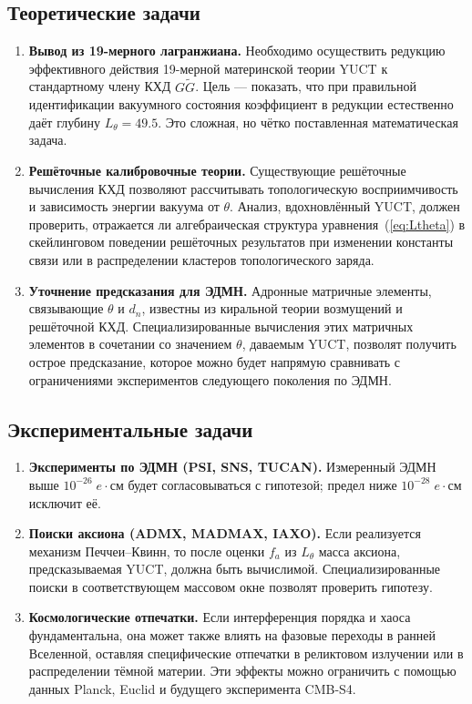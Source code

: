 \documentclass[11pt,a4paper]{article}
\begin{document}
	\subsection{Теоретические задачи}
	\begin{enumerate}
		\item \textbf{Вывод из 19-мерного лагранжиана.}
		Необходимо осуществить редукцию эффективного действия 19-мерной материнской теории YUCT к стандартному члену КХД \(G\widetilde{G}\). Цель — показать, что при правильной идентификации вакуумного состояния коэффициент в редукции естественно даёт глубину \(L_\theta = 49.5\). Это сложная, но чётко поставленная математическая задача.
		\item \textbf{Решёточные калибровочные теории.}
		Существующие решёточные вычисления КХД позволяют рассчитывать топологическую восприимчивость и зависимость энергии вакуума от \(\theta\). Анализ, вдохновлённый YUCT, должен проверить, отражается ли алгебраическая структура уравнения~(\ref{eq:Ltheta}) в скейлинговом поведении решёточных результатов при изменении константы связи или в распределении кластеров топологического заряда.
		\item \textbf{Уточнение предсказания для ЭДМН.}
		Адронные матричные элементы, связывающие \(\theta\) и \(d_n\), известны из киральной теории возмущений и решёточной КХД. Специализированные вычисления этих матричных элементов в сочетании со значением \(\theta\), даваемым YUCT, позволят получить острое предсказание, которое можно будет напрямую сравнивать с ограничениями экспериментов следующего поколения по ЭДМН.
	\end{enumerate}
	
	\subsection{Экспериментальные задачи}
	\begin{enumerate}
		\item \textbf{Эксперименты по ЭДМН (PSI, SNS, TUCAN).}
		Измеренный ЭДМН выше \(10^{-26}\;e\!\cdot\!\mathrm{см}\) будет согласовываться с гипотезой; предел ниже \(10^{-28}\;e\!\cdot\!\mathrm{см}\) исключит её.
		\item \textbf{Поиски аксиона (ADMX, MADMAX, IAXO).}
		Если реализуется механизм Печчеи–Квинн, то после оценки \(f_a\) из \(L_\theta\) масса аксиона, предсказываемая YUCT, должна быть вычислимой. Специализированные поиски в соответствующем массовом окне позволят проверить гипотезу.
		\item \textbf{Космологические отпечатки.}
		Если интерференция порядка и хаоса фундаментальна, она может также влиять на фазовые переходы в ранней Вселенной, оставляя специфические отпечатки в реликтовом излучении или в распределении тёмной материи. Эти эффекты можно ограничить с помощью данных Planck, Euclid и будущего эксперимента CMB-S4.
	\end{enumerate}
	
\end{document}
